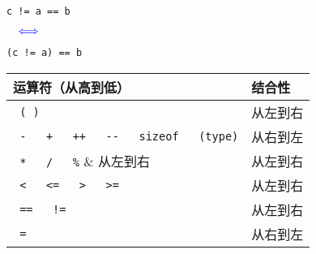 \begin{frame}[fragile]
 

\begin{minipage}{.4\textwidth}
\begin{lstlisting}
c != a == b
\end{lstlisting}
\end{minipage}$~~~\textcolor{blue}\Longleftrightarrow~~~$
\begin{minipage}{.4\textwidth}
\begin{lstlisting}
(c != a) == b
\end{lstlisting}
\end{minipage}

\end{frame}


\begin{frame}[fragile]
\begin{table}
\centering
\begin{tabular}{p{7cm}|p{2cm}}\hline
运算符（从高到低） & 结合性 \\\hline\hline
\lstinline| ( )| & 从左到右\\[0.1in]
\lstinline| -   +   ++   --   sizeof   (type)|
& 从右到左\\[0.1in]
\lstinline| *   /   %| & 从左到右 \\[0.1in]
\lstinline| +   -| & 从左到右 \\[0.1in]
\lstinline| <   <=   >   >=| & 从左到右\\[0.1in]
\lstinline| ==   !=| & 从左到右\\[0.1in]
\lstinline| = |& 从右到左\\\hline
\end{tabular}
\end{table}

\end{frame}
